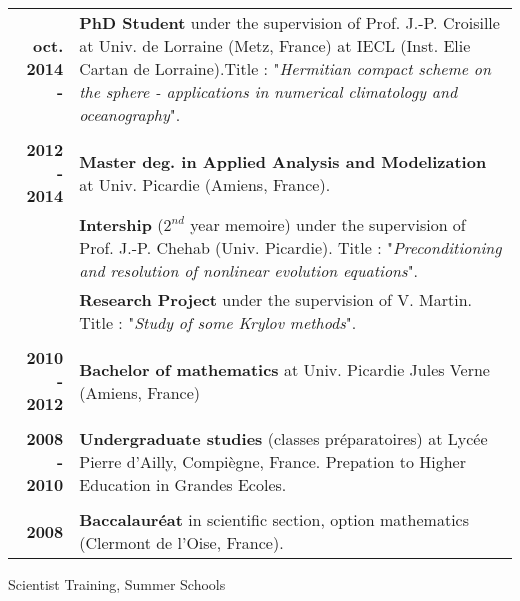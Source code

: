 \documentclass[10pt,a4paper]{report}
\begin{document}
\begin{center}
\begin{tabular}{r p{12cm}}
\textbf{oct. 2014 - } & \textbf{PhD Student} under the supervision of Prof. J.-P. Croisille at Univ. de Lorraine (Metz, France) at IECL (Inst. Elie Cartan de Lorraine).\newline Title : "\textit{Hermitian compact scheme on the sphere - applications in numerical climatology and oceanography}".\\

& \\

\textbf{2012 - 2014} & \textbf{Master deg. in Applied Analysis and Modelization} at Univ. Picardie (Amiens, France). \\

& \textbf{Intership} ($2^{nd}$ year memoire) under the supervision of Prof. J.-P. Chehab (Univ. Picardie). \newline 
Title : "\textit{Preconditioning and resolution of nonlinear evolution equations}". \\

& \textbf{Research Project} under the supervision of V. Martin. \newline 
Title : "\textit{Study of some Krylov methods}". \\

& \\

\textbf{2010 - 2012} & \textbf{Bachelor of mathematics} at Univ. Picardie Jules Verne (Amiens, France) \\

& \\

\textbf{2008 - 2010} & \textbf{Undergraduate studies} (classes préparatoires) at Lycée Pierre d'Ailly, Compiègne, France.\newline
Prepation to Higher Education in Grandes Ecoles. \\

& \\

\textbf{2008} & \textbf{Baccalauréat} in scientific section, option mathematics (Clermont de l'Oise, France).\\
\end{tabular}
\end{center}

\vspace{.5cm}
\noindent
{\selectfont
\begin{Large}
Scientist Training, Summer Schools
\end{Large}
\hrulefill
}
\end{document}
